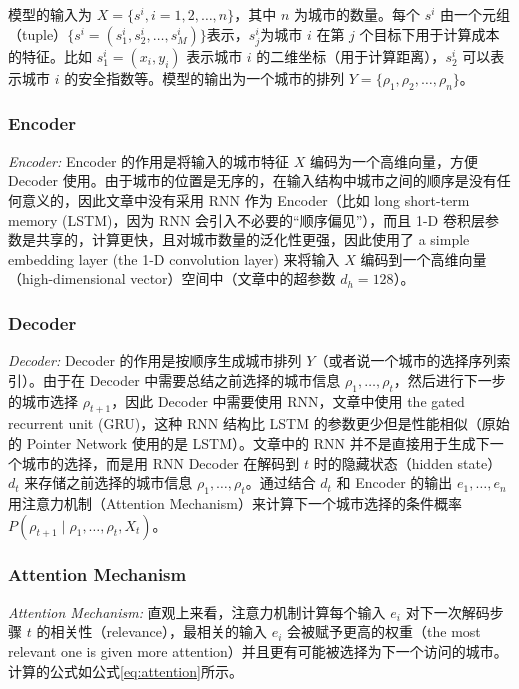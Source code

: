 \documentclass[fontset=none]{ctexart}
\begin{document}
模型的输入为 $X = \{s^i, i = 1, 2, \ldots, n\}$，其中 $n$ 为城市的数量。每个 $s^i$ 由一个元组（tuple）$\{s^i = (s^i_1, s^i_2, \ldots, s^i_M)\}$表示，$s^i_j$为城市 $i$ 在第 $j$ 个目标下用于计算成本的特征。比如 $s^i_1 = (x_i, y_i)$ 表示城市 $i$ 的二维坐标（用于计算距离），$s^i_2$ 可以表示城市 $i$ 的安全指数等。模型的输出为一个城市的排列 $Y = \{\rho_1, \rho_2, \ldots, \rho_n\}$。

\subsubsection{Encoder}

\textit{Encoder:} Encoder 的作用是将输入的城市特征 $X$ 编码为一个高维向量，方便 Decoder 使用。由于城市的位置是无序的，在输入结构中城市之间的顺序是没有任何意义的，因此文章中没有采用 RNN 作为 Encoder（比如 long short-term memory (LSTM)，因为 RNN 会引入不必要的“顺序偏见”），而且 1-D 卷积层参数是共享的，计算更快，且对城市数量的泛化性更强，因此使用了 a simple embedding layer (the 1-D convolution layer) 来将输入 $X$ 编码到一个高维向量（high-dimensional vector）空间中\cite{nazariReinforcementLearningSolving2018}（文章中的超参数 $d_h = 128$）。

\subsubsection{Decoder}

\textit{Decoder:} Decoder 的作用是按顺序生成城市排列 $Y$（或者说一个城市的选择序列索引）。由于在 Decoder 中需要总结之前选择的城市信息 $\rho_1, \ldots, \rho_t$，然后进行下一步的城市选择 $\rho_{t + 1}$，因此 Decoder 中需要使用 RNN，文章中使用 the gated recurrent unit (GRU)\cite{choLearningPhraseRepresentations2014}，这种 RNN 结构比 LSTM 的参数更少但是性能相似（原始的 Pointer Network 使用的是 LSTM\cite{nazariReinforcementLearningSolving2018}）。文章中的 RNN 并不是直接用于生成下一个城市的选择，而是用 RNN Decoder 在解码到 $t$ 时的隐藏状态（hidden state）$d_t$ 来存储之前选择的城市信息 $\rho_1, \ldots, \rho_t$。通过结合 $d_t$ 和 Encoder 的输出 $e_1,\ldots, e_n$ 用注意力机制（Attention Mechanism）来计算下一个城市选择的条件概率 $P(\rho_{t + 1} \mid \rho_1, \ldots, \rho_t, X_t)$。

\subsubsection{Attention Mechanism}

\textit{Attention Mechanism:} 直观上来看，注意力机制计算每个输入 $e_i$ 对下一次解码步骤 $t$ 的相关性（relevance），最相关的输入 $e_i$ 会被赋予更高的权重（the most relevant one is given more attention）并且更有可能被选择为下一个访问的城市。计算的公式如公式\cref{eq:attention}所示。
\end{document}
